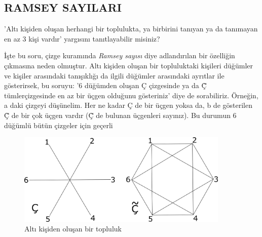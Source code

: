 \documentclass[11pt]{amsbook}
\begin{document}
\subsection{RAMSEY SAYILARI}
'Altı kişiden oluşan herhangi bir toplulukta, ya birbirini tanıyan ya da tanımayan en az 3 kişi vardır' yargısını tanıtlayabilir misiniz?

İşte bu soru, çizge kuramında \textit{Ramsey  sayısı} diye adlandırılan bir özelliğin çıkmasına neden olmuştur. Altı kişiden oluşan bir topluluktaki kişileri düğümler ve kişiler arasındaki tanışıklığı da ilgili düğümler arasındaki ayrıtlar ile gösterirsek, bu soruyu: '6 düğümden oluşan Ç çizgesinde ya da \c{\~C} tümlerçizgesinde en az bir üçgen olduğunu gösteriniz' diye de sorabiliriz. Örneğin, a daki çizgeyi düşünelim. Her ne kadar Ç de bir üçgen yoksa da, b de gösterilen \c{\~C} de bir çok üçgen vardır (\c{\~C}  de  bulunan üçgenleri sayınız). Bu durumun 6 düğümlü bütün çizgeler için geçerli 
\begin{figure}[h]
	\centering
	\includegraphics[width=0.9\textwidth]{images/ceyhun-037-fig01}
	\caption{Altı kişiden oluşan bir topluluk}
	\label{fig:altiKisidenOlusanBirTopluluk}
\end{figure}
\end{document}
